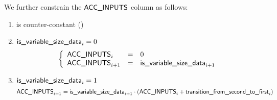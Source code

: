We further constrain the $\textsf{ACC\_INPUTS}$ column as follows:
\begin{enumerate}
    \item \accInputs{} is counter-constant \quad (\trash)

    \item \If $\textsf{is\_variable\_size\_data}_{i} = 0$ ~\Then
        \[
            \left\{ \begin{array}{lcl}
                \textsf{ACC\_INPUTS}_{i}     & = & 0                            \\
                \textsf{ACC\_INPUTS}_{i + 1} & = & \textsf{is\_variable\_size\_data}_{i+1} \\
            \end{array} \right.
        \]
    
    \item \If $\textsf{is\_variable\_size\_data}_{i} = 1$ \Then
        \[
            \textsf{ACC\_INPUTS}_{i+1}
            =
            \textsf{is\_variable\_size\_data}_{i+1} \cdot (\textsf{ACC\_INPUTS}_{i} + \textsf{transition\_from\_second\_to\_first}_{i})
        \]
\end{enumerate}